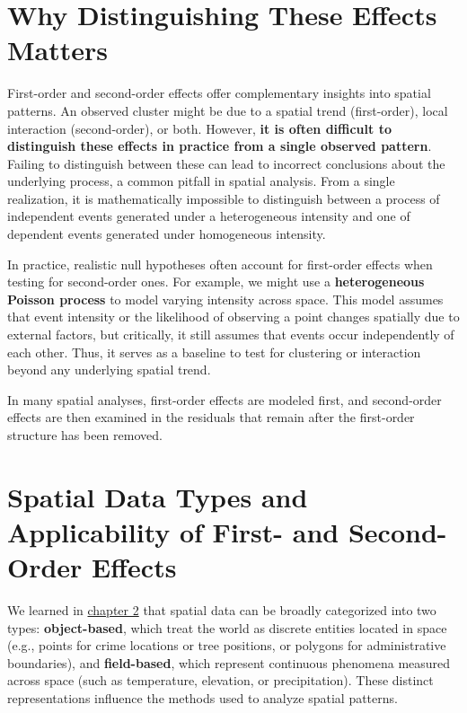 \documentclass[
  letterpaper,
]{book}
\begin{document}
\section{Why Distinguishing These Effects
Matters}\label{why-distinguishing-these-effects-matters}

First-order and second-order effects offer complementary insights into
spatial patterns. An observed cluster might be due to a spatial trend
(first-order), local interaction (second-order), or both. However,
\textbf{it is often difficult to distinguish these effects in practice
from a single observed pattern}. Failing to distinguish between these
can lead to incorrect conclusions about the underlying process, a common
pitfall in spatial analysis. From a single realization, it is
mathematically impossible to distinguish between a process of
independent events generated under a heterogeneous intensity and one of
dependent events generated under homogeneous intensity.

In practice, realistic null hypotheses often account for first-order
effects when testing for second-order ones. For example, we might use a
\textbf{heterogeneous Poisson process} to model varying intensity across
space. This model assumes that event intensity or the likelihood of
observing a point changes spatially due to external factors, but
critically, it still assumes that events occur independently of each
other. Thus, it serves as a baseline to test for clustering or
interaction beyond any underlying spatial trend.

In many spatial analyses, first-order effects are modeled first, and
second-order effects are then examined in the residuals that remain
after the first-order structure has been removed.

\section{Spatial Data Types and Applicability of First- and Second-Order
Effects}\label{spatial-data-types-and-applicability-of-first--and-second-order-effects}

We learned in \hyperref[object-vs.-field]{chapter 2} that spatial data
can be broadly categorized into two types: \textbf{object-based}, which
treat the world as discrete entities located in space (e.g., points for
crime locations or tree positions, or polygons for administrative
boundaries), and \textbf{field-based}, which represent continuous
phenomena measured across space (such as temperature, elevation, or
precipitation). These distinct representations influence the methods
used to analyze spatial patterns.
\end{document}
